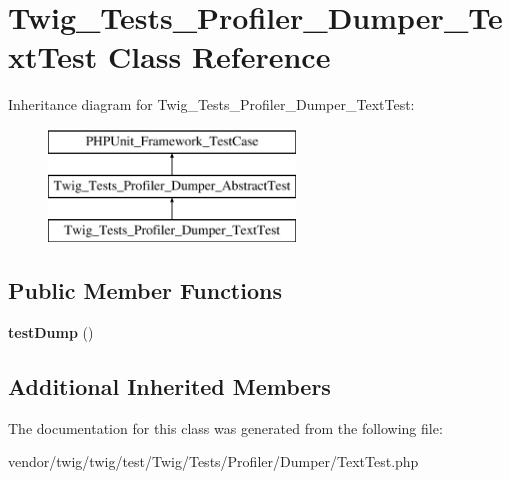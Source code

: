 \hypertarget{classTwig__Tests__Profiler__Dumper__TextTest}{}\section{Twig\+\_\+\+Tests\+\_\+\+Profiler\+\_\+\+Dumper\+\_\+\+Text\+Test Class Reference}
\label{classTwig__Tests__Profiler__Dumper__TextTest}
Inheritance diagram for Twig\+\_\+\+Tests\+\_\+\+Profiler\+\_\+\+Dumper\+\_\+\+Text\+Test\+:\begin{figure}[H]
\begin{center}
\leavevmode
\includegraphics[height=3.000000cm]{classTwig__Tests__Profiler__Dumper__TextTest}
\end{center}
\end{figure}
\subsection*{Public Member Functions}
\begin{DoxyCompactItemize}
\item 
{\bfseries test\+Dump} ()\hypertarget{classTwig__Tests__Profiler__Dumper__TextTest_a4286f0f90111fd57740ca21638328cf0}{}\label{classTwig__Tests__Profiler__Dumper__TextTest_a4286f0f90111fd57740ca21638328cf0}

\end{DoxyCompactItemize}
\subsection*{Additional Inherited Members}


The documentation for this class was generated from the following file\+:\begin{DoxyCompactItemize}
\item 
vendor/twig/twig/test/\+Twig/\+Tests/\+Profiler/\+Dumper/Text\+Test.\+php\end{DoxyCompactItemize}

